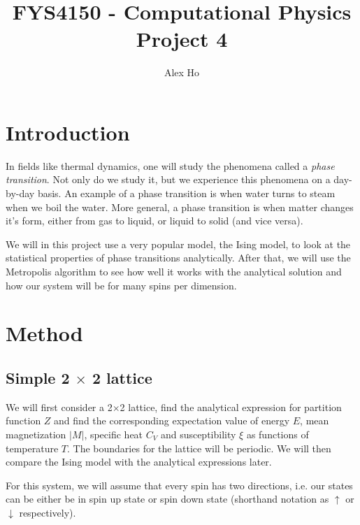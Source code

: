 \documentclass[12pt]{article}
\author{Alex Ho}
\title{FYS4150 - Computational Physics \\ Project 4}
\begin{document}
\maketitle

\tableofcontents
\newpage
\section{Introduction} \label{section:intro}
In fields like thermal dynamics, one will study the phenomena called a \emph{phase transition}. Not only do we study it, but we experience this phenomena on a day-by-day basis. An example of a phase transition is when water turns to steam when we boil the water. More general, a phase transition is when matter changes it's form, either from gas to liquid, or liquid to solid (and vice versa).

We will in this project use a very popular model, the Ising model, to look at the statistical properties of phase transitions analytically. After that, we will use the Metropolis algorithm to see how well it works with the analytical solution and how our system will be for many spins per dimension.


\section{Method} \label{section:methods}
\subsection{Simple 2 $\times$ 2 lattice}
We will first consider a 2$\times$2 lattice, find the analytical expression for partition function $Z$ and find the corresponding expectation value of energy $E$, mean magnetization $|M|$, specific heat $C_V$ and susceptibility $\xi$ as functions of temperature $T$. The boundaries for the lattice will be periodic. We will then compare the Ising model with the analytical expressions later.

For this system, we will assume that every spin has two directions, i.e. our states can be either be in spin up state or spin down state (shorthand notation as $\uparrow$ or $\downarrow$ respectively).
\end{document}

